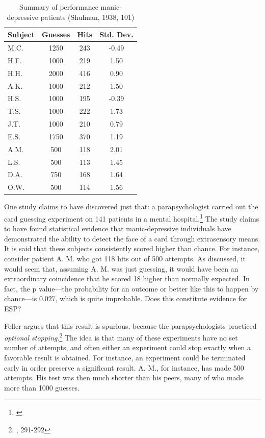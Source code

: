 \begin{table}[]
\centering
\begin{tabular}{l|c|c|c}
 Subject& Guesses &Hits  & Std. Dev. \\\hline
 M.C.& 1250 & 243 &  -0.49\\
H.F. &1000  & 219 & 1.50 \\
H.H. & 2000 & 416 & 0.90 \\
A.K. & 1000 & 212 & 1.50 \\
 H.S.& 1000 & 195 & -0.39 \\
 T.S. & 1000 & 222 & 1.73 \\
 J.T.& 1000 & 210 & 0.79 \\
 E.S.& 1750 & 370 & 1.19 \\
 A.M.& 500 & 118 & 2.01 \\
 L.S.& 500 & 113 & 1.45 \\
 D.A.& 750 & 168 &  1.64\\
 O.W.& 500 & 114 &  1.56
\end{tabular}
\caption{Summary of performance manic-depressive patients (Shulman, 1938, 101)}
\label{psychotable}
\end{table}

One study claims to have discovered just that: a parapsychologist
carried out the card guessing experiment on 141 patients in a mental
hospital.\footnote{\cite{psyesp}} The study claims to have found statistical evidence that
manic-depressive individuals have demonstrated the ability to detect the
face of a card through extrasensory means. It is said that these
subjects consistently scored higher than chance. For instance, consider
patient A. M. who got 118 hits out of 500 attempts. As discussed, it
would seem that, assuming A. M. was just guessing, it would have been an
extraordinary coincidence that he scored 18 higher than normally
expected. In fact, the p value---the probability for an outcome or
better like this to happen by chance---is \(0.027\), which is quite
improbable. Does this constitute evidence for ESP?

Feller argues that this result is spurious, because the
parapsychologists practiced \emph{optional stopping}.\footnote{\cite{felleresp}, 291-292} The idea is that
many of these experiments have no set number of attempts, and often
either an experiment could stop exactly when a favorable result is
obtained. For instance, an experiment could be terminated early in order
preserve a significant result. A. M., for instance, has made 500
attempts. His test was then much shorter than his peers, many of who
made more than 1000 guesses.

